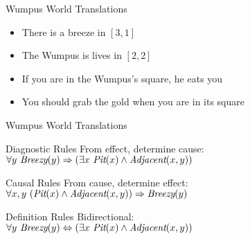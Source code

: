 \documentclass[14pt]{beamer}
\begin{document}
\begin{frame}{Wumpus World Translations}
\begin{itemize}
\item
There is a breeze in $[3, 1]$ \\
\bigskip
\item
The Wumpus is lives in $[2, 2]$ \\
\bigskip
\item
If you are in the Wumpus's square, he eats you \\
\bigskip
\item
You should grab the gold when you are in its square \\
\end{itemize}
\end{frame}

\begin{frame}{Wumpus World Translations}
	\begin{block}{Diagnostic Rules}
		From effect, determine cause: \\
		\tab$\forall y\ \textit{Breezy}(y) \Rightarrow (\exists x\ \textit{Pit}(x) \land \textit{Adjacent}(x, y))$
	\end{block}
	\pause
	\begin{block}{Causal Rules}
		From cause, determine effect: \\
		\tab$\forall x,y\ (\textit{Pit}(x) \land \textit{Adjacent}(x, y)) \Rightarrow \textit{Breezy}(y)$
	\end{block}
	\pause
	\begin{block}{Definition Rules}
		Bidirectional: \\
		\tab$\forall y\ \textit{Breezy}(y) \Leftrightarrow (\exists x\ \textit{Pit}(x) \land \textit{Adjacent}(x, y))$
	\end{block}
\end{frame}
\end{document}
